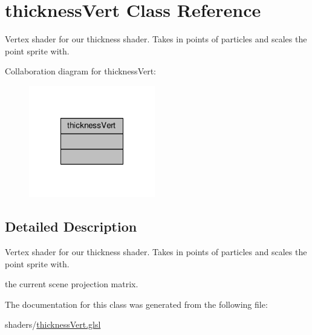 \hypertarget{classthickness_vert}{\section{thickness\-Vert Class Reference}
\label{classthickness_vert}
}


Vertex shader for our thickness shader. Takes in points of particles and scales the point sprite with.  




Collaboration diagram for thickness\-Vert\-:\nopagebreak
\begin{figure}[H]
\begin{center}
\leavevmode
\includegraphics[width=156pt]{classthickness_vert__coll__graph}
\end{center}
\end{figure}


\subsection{Detailed Description}
Vertex shader for our thickness shader. Takes in points of particles and scales the point sprite with. 

the current scene projection matrix. 

The documentation for this class was generated from the following file\-:\begin{DoxyCompactItemize}
\item 
shaders/\hyperlink{thickness_vert_8glsl}{thickness\-Vert.\-glsl}\end{DoxyCompactItemize}
